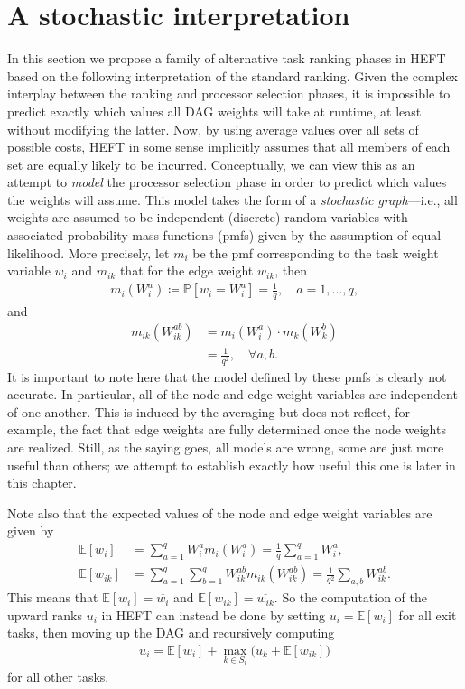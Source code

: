 \documentclass[12pt]{article}
\def\P{\mathbb{P}}
\def\E{\mathbb{E}}
\begin{document}
\section{A stochastic interpretation}
\label{sect.alt_rankings}

In this section we propose a family of alternative task ranking phases in HEFT based on the following interpretation of the standard ranking. Given the complex interplay between the ranking and processor selection phases, it is impossible to predict exactly which values all DAG weights will take at runtime, at least without modifying the latter. Now, by using average values over all sets of possible costs, HEFT in some sense implicitly assumes that all members of each set are equally likely to be incurred. Conceptually, we can view this as an attempt to {\em model} the processor selection phase in order to predict which values the weights will assume. This model takes the form of a {\em stochastic graph}---i.e., all weights are assumed to be independent (discrete) random variables with associated probability mass functions (pmfs) given by the assumption of equal likelihood. More precisely, let $m_i$ be the pmf corresponding to the task weight variable $w_i$ and $m_{ik}$ that for the edge weight $w_{ik}$, then  
\begin{align*}
m_i(W_i^a) \coloneqq \P[w_i = W_i^a] = \frac{1}{q}, \quad a = 1, \dots, q,
\end{align*}
and   
\begin{align*}
m_{ik}(W_{ik}^{ab}) &= m_i(W_i^a) \cdot m_k(W_k^b) \\
&= \frac{1}{q^2}, \quad \forall a, b.
\end{align*}
It is important to note here that the model defined by these pmfs is clearly not accurate. In particular, all of the node and edge weight variables are independent of one another. This is induced by the averaging but does not reflect, for example, the fact that edge weights are fully determined once the node weights are realized. Still, as the saying goes, all models are wrong, some are just more useful than others; we attempt to establish exactly how useful this one is later in this chapter.     

Note also that the expected values of the node and edge weight variables are given by
\begin{align}
\E[w_i] &= \sum_{a = 1}^{q} W_i^a m_i(W_i^a) = \frac{1}{q} \sum_{a = 1}^{q} W_i^a, \label{eq.expected_node}\\
\E[w_{ik}] &= \sum_{a = 1}^{q} \sum_{b = 1}^{q}  W_{ik}^{ab} m_{ik}(W_{ik}^{ab}) = \frac{1}{q^2} \sum_{a, b} W_{ik}^{ab} \label{eq.expected_edge}.
\end{align}
This means that $\E[w_i] = \overline{w_i}$ and $\E[w_{ik}] = \overline{w_{ik}}$. So the computation of the upward ranks $u_i$ in HEFT can instead be done by setting $u_i = \E[w_i]$ for all exit tasks, then moving up the DAG and recursively computing
\begin{align}
u_i = \E[w_i] + \max_{k \in S_i} \big( u_k + \E[w_{ik}] \big) \label{eq.ur_expectation}
\end{align}
for all other tasks. 
\end{document}
